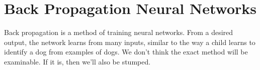 \documentclass{article}
\begin{document}
\section{Back Propagation Neural Networks}
    Back propagation is a method of training neural networks. From a desired output, the network learns from many inputs, similar to the way a child learns to identify a dog from examples of dogs. We don't think the exact method will be examinable. If it is, then we'll also be stumped.
\end{document}
